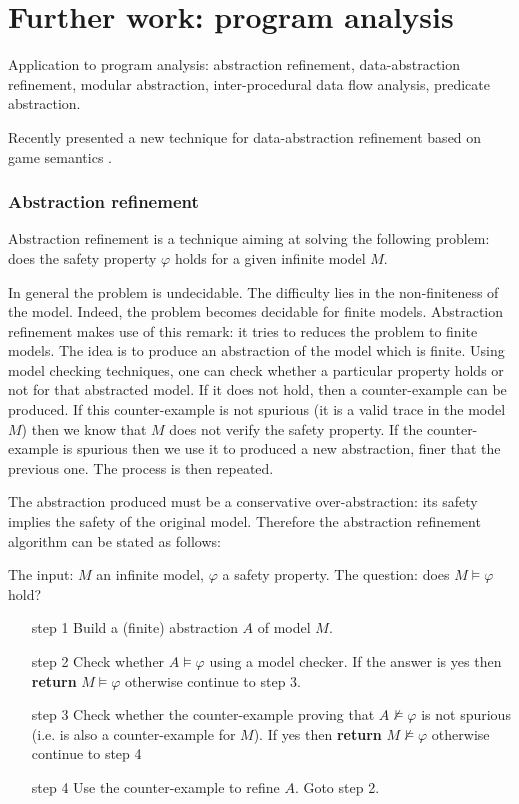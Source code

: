 \section{Further work: program analysis}

Application to program analysis: abstraction refinement,
data-abstraction refinement, modular abstraction, inter-procedural
data flow analysis, predicate abstraction.

Recently \citeauthor{DBLP:conf/sas/DimovskiGL05} presented a new
technique for data-abstraction refinement based on game semantics
\citep{DBLP:conf/sas/DimovskiGL05} .


\todomargin{}
\subsubsection{Abstraction refinement}

Abstraction refinement is a technique aiming at solving the
following problem: does the safety property $\varphi$ holds for a
given infinite model $M$.

In general the problem is undecidable. The difficulty lies in the
non-finiteness of the model. Indeed, the problem becomes decidable
for finite models. Abstraction refinement makes use of this remark:
it tries to reduces the problem to finite models. The idea is to
produce an abstraction of the model which is finite. Using model
checking techniques, one can check whether a particular property
holds or not for that abstracted model. If it does not hold, then a
counter-example can be produced. If this counter-example is not
spurious (it is a valid trace in the model $M$) then we know that
$M$ does not verify the safety property. If the counter-example is
spurious then we use it to produced a new abstraction, finer that
the previous one. The process is then repeated.

The abstraction produced must be a conservative over-abstraction:
its safety implies the safety of the original model. Therefore the
abstraction refinement algorithm can be stated as follows:

\begin{algo}
The input: $M$ an infinite model, $\varphi$ a safety property. The
question: does $M \models \varphi$ hold?
\begin{enumerate}
\item[step 1] Build a (finite) abstraction $A$ of model $M$.
\item[step 2] Check whether $A \models \varphi$ using a model
checker. If the answer is yes then \textbf{return} $M \models
\varphi$ otherwise continue to step 3.

\item[step 3] Check whether the counter-example proving that $A \not \models
\varphi$ is not spurious (i.e. is also a counter-example for $M$).
If yes then \textbf{return} $M \not\models \varphi$ otherwise
continue to step 4

\item[step 4] Use the counter-example to refine $A$. Goto step 2.
\end{enumerate}
\end{algo}


